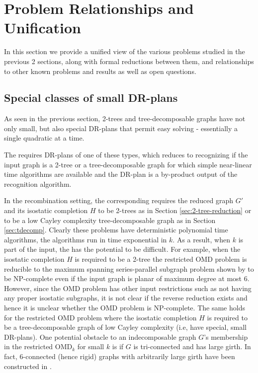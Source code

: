\section{Problem Relationships and Unification}
\label{sec:table}
In this section we provide a unified view of  the various problems
studied in the previous 2 sections, along with formal reductions
between them, and relationships to other known problems and results as
well as open questions.
%
\subsection{Special classes of small DR-plans}
As seen in the previous section, 2-trees and tree-decomposable graphs
have not only small, but also special DR-plans that permit easy
solving - essentially a single quadratic at a time.

The  requires DR-plans of
one of these types, which reduces to recognizing if the input graph is
a 2-tree or a tree-decomposable graph for which simple near-linear
time algorithms are available \cite{valdes1979recognition,fudos1997graph} and the DR-plan is a
by-product output of the recognition algorithm.

In the recombination setting, the corresponding  requires the reduced graph $G'$ and its isostatic
completion $H$ to be 2-trees as in Section \ref{sec:2-tree-reduction}
or to be a low Cayley complexity tree-decomposable graph as in Section
\ref{sec:tdecomp}. Clearly these problems have deterministic
polynomial time algorithms, the algorithms run in time exponential in
$k$. As a result, when $k$ is part of the input, the  has the potential to be difficult. For example, when the
isostatic completion $H$ is required to be a 2-tree the restricted OMD
problem is reducible to the maximum spanning series-parallel subgraph
problem shown by \cite{cai1993spanning} to be NP-complete even if the input
graph is planar of maximum degree at most 6. However, since the OMD
problem has other input restrictions such as not having any proper
isostatic subgraphs, it is not clear if the reverse reduction exists
and hence it is unclear whether the OMD problem is NP-complete. The
same holds for the restricted OMD problem where the isostatic
completion $H$ is required to be a tree-decomposable graph of low
Cayley complexity (i.e, have special, small DR-plans). One potential
obstacle to an indecomposable graph $G$'s membership in the restricted
OMD$_k$ for small $k$ is if $G$ is tri-connected and has large girth.
In fact, 6-connected (hence rigid) graphs with arbitrarily large girth
have been constructed in \cite{servatius2000rigidity}.
%
